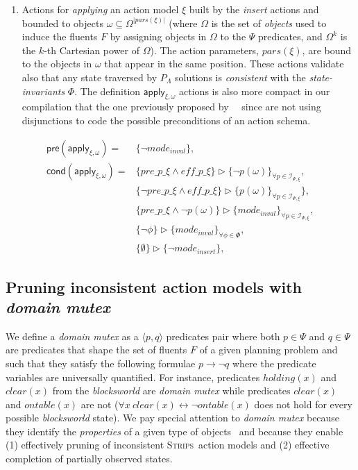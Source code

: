 \documentclass{article}
\newcommand{\tup}[1]{{\langle #1 \rangle}}
\newcommand{\pre}{\mathsf{pre}}     %
\newcommand{\cond}{\mathsf{cond}}   %
\newcommand{\strips}{\textsc{Strips}}
\begin{document}
\begin{itemize}
\begin{enumerate}
\item Actions for {\em applying} an action model $\xi$ built by the {\em insert} actions and bounded to objects $\omega\subseteq\Omega^{|pars(\xi)|}$ (where $\Omega$ is the set of {\em objects} used to induce the fluents $F$ by assigning objects in $\Omega$ to the $\Psi$ predicates, and $\Omega^k$ is the $k$-th Cartesian power of $\Omega$). The action parameters, $pars(\xi)$, are bound to the objects in $\omega$ that appear in the same position. These actions validate also that any state traversed by $P_{\Lambda}$ solutions is {\em consistent} with the {\em state-invariants} $\Phi$. The definition $\mathsf{apply_{\xi,\omega}}$ actions is also more compact in our compilation that the one previously proposed by~\citeauthor{aineto2018learning}~\citeyear{aineto2018learning} since are not using disjunctions to code the possible preconditions of an action schema.
\end{enumerate}
\end{itemize}

\begin{small}
\begin{align*}
\pre(\mathsf{apply_{\xi,\omega}})=&\{\neg mode_{inval}\},\\
\cond(\mathsf{apply_{\xi,\omega}})=&\{pre\_p\_\xi\wedge eff\_p\_\xi\}\rhd\{\neg p(\omega)\}_{\forall p\in{\mathcal I}_{\Psi,\xi}},\\
&\{\neg pre\_p\_\xi \wedge eff\_p\_\xi\}\rhd\{p(\omega)\}_{\forall p\in{\mathcal I}_{\Psi,\xi}}\},\\
&\{pre\_p\_\xi \wedge \neg p(\omega)\}\rhd\{mode_{inval}\}_{\forall p\in{\mathcal I}_{\Psi,\xi}},\\
&\{\neg\phi\}\rhd\{mode_{inval}\}_{\forall \phi\in\Phi},\\
&\{\emptyset\}\rhd\{\neg mode_{insert}\},
\end{align*}
\end{small}

\subsection{Pruning inconsistent action models with {\em domain mutex}}
We define a {\em domain mutex} as a $\tup{p,q}$ predicates pair where both $p\in\Psi$ and $q\in\Psi$ are predicates that shape the set of fluents $F$ of a given planning problem and such that they satisfy the following formulae $p\rightarrow \neg q$ where the predicate variables are universally quantified. For instance, predicates $holding(x)$ and $clear(x)$ from the {\em blocksworld} are {\em domain mutex} while predicates $clear(x)$ and $ontable(x)$ are not ($\forall x\ clear(x)\leftrightarrow\neg ontable(x)$ does not hold for every possible {\em blocksworld} state). We pay special attention to {\em domain mutex} because they identify the {\em properties} of a given type of objects~\cite{fox:TIM:JAIR1998} and because they enable (1) effectively pruning of inconsistent \strips\ action models and (2) effective completion of partially observed states. 
\end{document}
